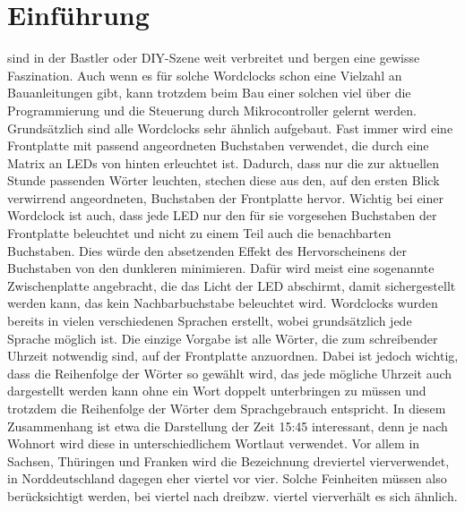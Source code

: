\documentclass[12pt,journal,compsoc]{IEEEtran}
\begin{document}
%


\section{Einführung}

 sind in der Bastler oder DIY-Szene weit verbreitet und bergen eine gewisse Faszination. Auch wenn es für solche Wordclocks schon eine Vielzahl an Bauanleitungen gibt, kann trotzdem beim Bau einer solchen viel über die Programmierung und die Steuerung durch Mikrocontroller gelernt werden.
Grundsätzlich sind alle Wordclocks sehr ähnlich aufgebaut. Fast immer wird eine Frontplatte mit passend angeordneten  Buchstaben verwendet, die durch eine Matrix an LEDs von hinten erleuchtet ist. Dadurch, dass nur die zur aktuellen Stunde passenden   Wörter leuchten, stechen diese aus den, auf den ersten Blick verwirrend angeordneten, Buchstaben der Frontplatte hervor. Wichtig bei einer Wordclock ist auch, dass jede LED nur den für sie vorgesehen Buchstaben der Frontplatte beleuchtet und nicht zu einem Teil auch die benachbarten Buchstaben. Dies würde den absetzenden Effekt des Hervorscheinens der Buchstaben von den dunkleren minimieren. Dafür wird meist eine sogenannte Zwischenplatte angebracht, die das Licht der LED abschirmt, damit sichergestellt werden kann, das kein Nachbarbuchstabe beleuchtet wird.
Wordclocks wurden bereits in vielen verschiedenen Sprachen erstellt, wobei  grundsätzlich jede Sprache möglich ist. Die einzige Vorgabe ist alle Wörter, die zum \glqq schreiben\grqq der Uhrzeit notwendig sind, auf der Frontplatte anzuordnen. Dabei ist jedoch wichtig, dass die Reihenfolge der Wörter so gewählt wird, das jede mögliche Uhrzeit auch dargestellt werden kann ohne ein Wort doppelt unterbringen zu müssen und trotzdem die Reihenfolge der Wörter dem Sprachgebrauch entspricht. In diesem Zusammenhang ist etwa die Darstellung der Zeit 15:45 interessant, denn je nach Wohnort wird diese in unterschiedlichem Wortlaut verwendet. Vor allem in Sachsen, Thüringen und Franken wird die Bezeichnung \glqq dreviertel vier\grqq verwendet, in Norddeutschland dagegen eher \glqq viertel vor vier\grqq. Solche Feinheiten müssen also berücksichtigt werden, bei \glqq viertel nach drei\grqq bzw. \glqq viertel vier\grqq verhält es sich ähnlich.
\end{document}
